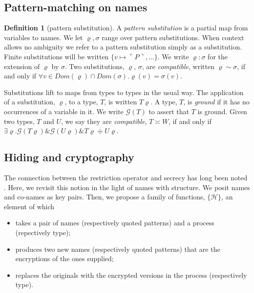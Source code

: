 \documentclass[]{amsart}
\newcommand{\lpquote}{\ulcorner}
\newcommand{\rpquote}{\urcorner}
\newcommand{\quotep}[1]{\lpquote #1 \rpquote}
\theoremstyle{definition}
\newtheorem{defn}[thm]{Definition}
\theoremstyle{remark}
\numberwithin{equation}{subsection}
\begin{document}
\subsection{Pattern-matching on names}

\begin{defn}[pattern substitution]
A \textit{pattern substitution} is a partial map from variables to
names. We let $\varrho, \sigma$ range over pattern substitutions. When
context allows no ambiguity we refer to a pattern substitution simply
as a substitution. Finite substitutions will be written $\{ v \mapsto
\quotep{P}, ... \}$. We write $\varrho : \sigma$ for the extension of 
$\varrho$ by $\sigma$. Two substitutions, $\varrho$, $\sigma$, are
\textit{compatible}, written $\varrho \sim \sigma$, if and only if
$\forall v \in Dom(\varrho) \cap Dom(\sigma).\varrho(v) =
\sigma(v)$. 

Substitutions lift to maps from types to types in the usual way. The
application of a substitution, $\varrho$, to a type, $T$, is written
$T\varrho$. A type, $T$, is \textit{ground} if it has no occurrences
of a variable in it. We write ${\mathcal G}(T)$ to assert that $T$ is
ground. Given two types, $T$ and $U$, we say they are
\textit{compatible}, $T \asymp W$, if and only if 
$\exists \varrho . {\mathcal G}(T\varrho) \& {\mathcal G}(U\varrho) \&
T\varrho \doteqdot U\varrho$.
\end{defn}

\subsection{Hiding and cryptography}

The connection between the restriction operator and secrecy has long
been noted \cite{Gordon} \cite{Abadi}. Here, we revisit this notion in
the light of names with structure. We posit names and co-names as key
pairs. Then, we propose a family of functions, $\{ {\mathcal H} \}$, an element of which 

\begin{itemize}
	\item takes a pair of names (respectively quoted patterns) and a process (repectively type);
    \item produces two new names (respectively quoted patterns) that are the encryptions of the ones supplied;
	\item replaces the originals with the encrypted versions in the process (respectively type).
\end{itemize}
\end{document}
